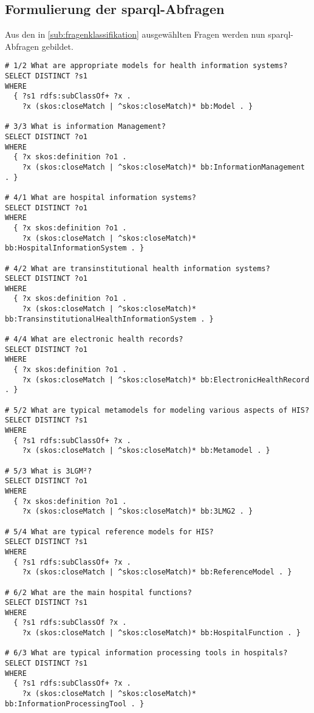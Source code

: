 \subsection{Formulierung der \ac{sparql}-Abfragen}

Aus den in \cref{sub:fragenklassifikation} ausgewählten Fragen werden nun \ac{sparql}-Abfragen gebildet.

\begin{lstlisting}[language=SPARQL]
# 1/2 What are appropriate models for health information systems?
SELECT DISTINCT ?s1
WHERE
  { ?s1 rdfs:subClassOf+ ?x .
    ?x (skos:closeMatch | ^skos:closeMatch)* bb:Model . }

# 3/3 What is information Management?
SELECT DISTINCT ?o1
WHERE
  { ?x skos:definition ?o1 .
    ?x (skos:closeMatch | ^skos:closeMatch)* bb:InformationManagement . }

# 4/1 What are hospital information systems?
SELECT DISTINCT ?o1
WHERE
  { ?x skos:definition ?o1 .
    ?x (skos:closeMatch | ^skos:closeMatch)* bb:HospitalInformationSystem . }

# 4/2 What are transinstitutional health information systems?
SELECT DISTINCT ?o1
WHERE
  { ?x skos:definition ?o1 .
    ?x (skos:closeMatch | ^skos:closeMatch)* bb:TransinstitutionalHealthInformationSystem . }

# 4/4 What are electronic health records?
SELECT DISTINCT ?o1
WHERE
  { ?x skos:definition ?o1 .
    ?x (skos:closeMatch | ^skos:closeMatch)* bb:ElectronicHealthRecord . }

# 5/2 What are typical metamodels for modeling various aspects of HIS?
SELECT DISTINCT ?s1
WHERE
  { ?s1 rdfs:subClassOf+ ?x .
    ?x (skos:closeMatch | ^skos:closeMatch)* bb:Metamodel . }

# 5/3 What is 3LGM²?
SELECT DISTINCT ?o1
WHERE
  { ?x skos:definition ?o1 .
    ?x (skos:closeMatch | ^skos:closeMatch)* bb:3LMG2 . }

# 5/4 What are typical reference models for HIS?
SELECT DISTINCT ?s1
WHERE
  { ?s1 rdfs:subClassOf+ ?x .
    ?x (skos:closeMatch | ^skos:closeMatch)* bb:ReferenceModel . }

# 6/2 What are the main hospital functions?
SELECT DISTINCT ?s1
WHERE
  { ?s1 rdfs:subClassOf ?x .
    ?x (skos:closeMatch | ^skos:closeMatch)* bb:HospitalFunction . }

# 6/3 What are typical information processing tools in hospitals?
SELECT DISTINCT ?s1
WHERE
  { ?s1 rdfs:subClassOf+ ?x .
    ?x (skos:closeMatch | ^skos:closeMatch)* bb:InformationProcessingTool . }


\end{lstlisting}

